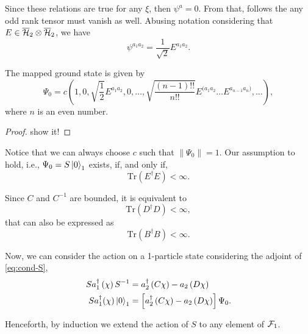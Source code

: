Since these relations are true for any \(\xi\), then \(\psi^a=0\). From that, follows the any odd rank tensor must vanish as well. Abusing notation considering that \(E\in\overline{{\mathcal{H}}}_2\otimes\overline{{\mathcal{H}}}_2\), we have
\begin{equation}
    \psi^{a_1a_2}=\frac{1}{\sqrt{2}}E^{a_1a_2}.
\end{equation}
\begin{proposition}
    The mapped ground state is given by
    \begin{equation}
        \Psi_0=c\left(1,0,\sqrt{\frac{1}{2}}E^{a_1a_2},0,\dots,\sqrt{\frac{(n-1)!!}{n!!}}E^{(a_1a_2}\dots E^{a_{n-1}a_n)},\dots\right),
    \end{equation}
    where \(n\) is an even number.
\end{proposition}
\begin{proof}
    show it!
\end{proof}

Notice that we can always choose \(c\) such that \(\lVert\Psi_0\rVert=1\). Our assumption to hold, i.e., \(\Psi_0=S\ket{0}_1\) exists, if, and only if,
\begin{equation}
    \text{Tr}\left(E^{\dagger}E\right)<\infty.
\end{equation}

Since \(C\) and \(C^{-1}\) are bounded, it is equivalent to
\begin{equation}
    \text{Tr}\left(D^{\dagger}D\right)<\infty,
\end{equation}
that can also be expressed as 
\begin{equation}
    \text{Tr}\left(B^{\dagger}B\right)<\infty.
\end{equation}

Now, we can consider the action on a 1-particle state considering the adjoint of \cref{eq:cond-S},
\begin{subequations}
    \begin{align}
        Sa_1^{\dagger}\left(\chi\right)S^{-1}&=a_2^\dagger\left(C\chi\right)-a_2\left(D\chi\right)\\
        Sa_1^\dagger(\chi)\ket{0}_1&=\left[a_2^\dagger\left(C\chi\right)-a_2\left(D\chi\right)\right]\Psi_0.
    \end{align}
\end{subequations}

Henceforth, by induction we extend the action of \(S\) to any element of \({\mathcal{F}}_1\).
\\
\vspace{1mm}
\begin{center}
\end{center}

